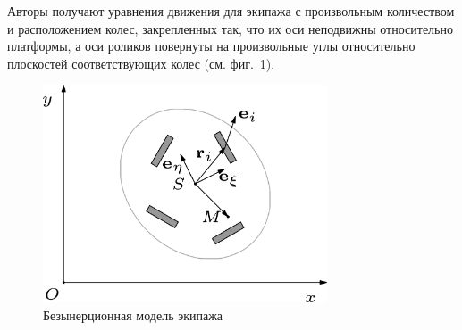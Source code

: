 Авторы \cite{Borisov2011} получают уравнения движения для экипажа с произвольным количеством и расположением колес, закрепленных так, что их оси неподвижны относительно платформы, а оси роликов повернуты на произвольные углы относительно плоскостей соответствующих колес (см. фиг.~\ref{fig:bor_vehicle}).

\begin{figure}[ht!]
    \centering
    \includegraphics[width=0.75\textwidth]{content/pic/asy/cart_bor.png}
    \caption{Безынерционная модель экипажа}
    \label{fig:bor_vehicle}
\end{figure}

